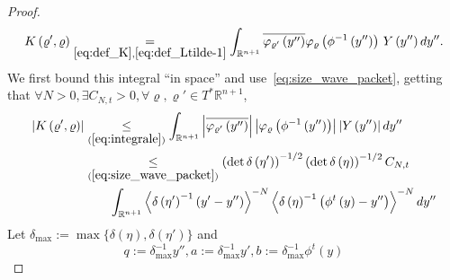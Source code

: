 \documentclass[AHL,Unicode,longabstracts,published]{cedram}
\newcommand*\ineq[1]{\underset{(#1)}{\leq}}
\newcommand{\bbR}{\mathbb{R}}
\let\oldexists\exists
\renewcommand*{\exists}{\mathrel{\oldexists}}
\let\oldforall\forall
\renewcommand*{\forall}{\mathrel{\oldforall}}
\newcommand{\bbR}{\mathbb{R}}
\begin{document}
\begin{proof}
\begin{align}\label{eq:integrale}
K\left(\varrho',\varrho\right) \underset{\eqref{eq:def_K},\eqref{eq:def_Ltilde-1}}{=}\int_{\bbR^{n+1}}\overline{\varphi_{\varrho'}\left(y''\right)}\varphi_{\varrho}\left(\phi^{-1}\left(y''\right)\right)\,Y\left(y''\right)dy''.
\end{align}
We first bound this integral ``in space'' and use~\eqref{eq:size_wave_packet}, getting that $\forall N>0,\exists C_{N,t}>0,\forall\varrho,\varrho'\in T^{*}\bbR^{n+1}$,
\begin{align}
\left|K\left(\varrho',\varrho\right)\right| & \ineq{\ref{eq:integrale}}\int_{\bbR^{n+1}}\left|\overline{\varphi_{\varrho'}\left(y''\right)}\right|\left|\varphi_{\varrho}\left(\phi^{-1}\left(y''\right)\right)\right|\left|Y\left(y''\right)\right|dy''\label{eq:integrale-1}
\\
& \ineq{\ref{eq:size_wave_packet}}\left(\det \delta\left(\eta'\right)\right)^{-1/2}\left(\det \delta\left(\eta\right)\right)^{-1/2}C_{N,t}\nonumber\\
& \qquad\int_{\bbR^{n+1}}\left\langle \delta\left(\eta'\right)^{-1}\left(y'-y''\right)\right\rangle ^{-N}\left\langle \delta\left(\eta\right)^{-1}\left(\phi^{t}\left(y\right)-y''\right)\right\rangle ^{-N}dy''\label{eq:integrand}\nonumber
\end{align}
Let $\delta_{\max}:=\max\{\delta(\eta),\delta(\eta')\} $ and
\[
q:=\delta_{\max}^{-1}y'',a:=\delta_{\max}^{-1}y',b:=\delta_{\max}^{-1}\phi^{t}\left(y\right)
\]


\end{proof}
\end{document}
